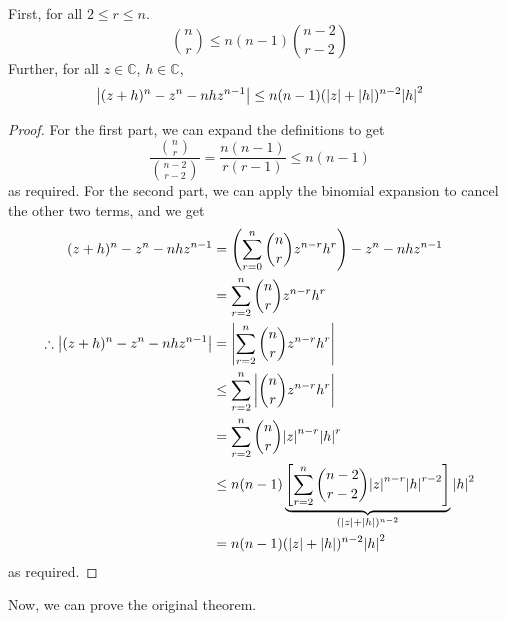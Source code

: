 \documentclass{article}
\begin{document}
\begin{lemma}
	First, for all $2 \leq r \leq n$.
	\[ \binom{n}{r} \leq n(n-1)\binom{n-2}{r-2} \]
	Further, for all $z \in \mathbb C$, $h \in \mathbb C$,
	\[ \abs{(z + h)^n - z^n - nhz^{n-1}} \leq n(n-1)(\abs{z} + \abs{h})^{n-2}\abs{h}^2 \]
\end{lemma}
\begin{proof}
	For the first part, we can expand the definitions to get
	\[ \frac{\binom{n}{r}}{\binom{n-2}{r-2}} = \frac{n(n-1)}{r(r-1)} \leq n(n-1) \]
	as required. For the second part, we can apply the binomial expansion to cancel the other two terms, and we get
	\begin{align*}
		(z + h)^n - z^n - nhz^{n-1}                  & = \left( \sum_{r=0}^n \binom{n}{r} z^{n-r} h^r \right)  - z^n - nhz^{n-1}                                                               \\
		                                             & = \sum_{r=2}^n \binom{n}{r} z^{n-r} h^r                                                                                                 \\
		\therefore \abs{(z + h)^n - z^n - nhz^{n-1}} & = \abs{\sum_{r=2}^n \binom{n}{r} z^{n-r} h^r}                                                                                           \\
		                                             & \leq \sum_{r=2}^n \abs{\binom{n}{r} z^{n-r} h^r}                                                                                        \\
		                                             & = \sum_{r=2}^n \binom{n}{r} \abs{z}^{n-r} \abs{h}^r                                                                                     \\
		                                             & \leq n(n-1) \underbrace{\left[ \sum_{r=2}^n \binom{n-2}{r-2} \abs{z}^{n-r} \abs{h}^{r-2} \right]}_{(\abs{z} + \abs{h})^{n-2}} \abs{h}^2 \\
		                                             & = n(n-1) (\abs{z} + \abs{h})^{n-2} \abs{h}^2                                                                                            \\
	\end{align*}
	as required.
\end{proof}
\noindent Now, we can prove the original theorem.
\end{document}
